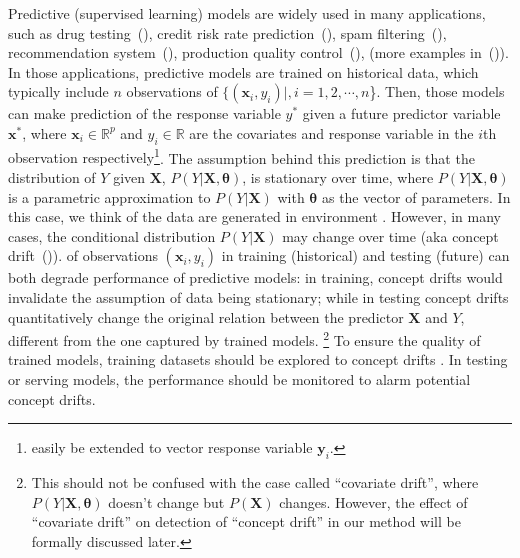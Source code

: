 \documentclass[twoside,11pt]{article}
\begin{document}
%
Predictive (supervised learning) models are widely used in many applications, {such as} drug testing~(\cite{fong2015change}), credit risk rate prediction~(\cite{im2012time}), spam filtering~(\cite{carmona2010gnusmail}), recommendation system~(\cite{koren2009collaborative}), production quality control~(\cite{bui2018monitoring}), {(more examples in~(\cite{vzliobaite2016overview}))}. In those applications, predictive models are trained on historical data, which typically include {$n$} observations of {$\{ (\bm {x}_i, y_i)|, i=1,2,\cdots,n$\}}. {Then, those models can make prediction of the response variable $y^*$ given a future predictor variable $\bm {x}^*$}, where {$\bm {x}_i \in \mathbb{R}^{p}$ and $y_i \in \mathbb{R}$ are the covariates and response variable in the $i$th observation respectively}\footnote{ easily be extended to vector response variable $\bm {y}_i$.}. The assumption behind this prediction is that the distribution of {$ {Y}$} given {$\bm {X}$}, {$P (Y| \bm {X}, \bm { \theta})$}, is stationary over time, {where $P (Y| \bm {X}, \bm { \theta})$ is a parametric approximation to $P (Y| \bm {X})$ with $\bm { \theta}$ as the vector of parameters}. In this case, we think of the data are generated in  environment . However, {in many cases, the} conditional distribution $P (Y| \bm {X})$ may change over time (aka concept drift~(\cite{moreno2012unifying})).  of observations $ (\bm {x}_i, y_i)$ in training (historical) and testing (future) can both degrade performance of predictive models: in training, concept drifts would invalidate the assumption of data being stationary; while in testing concept drifts quantitatively change the original relation between the predictor $\bm {X}$ and $Y$, different from the one captured by trained models. \footnote{This should not be confused with the case called ``covariate drift'', where {$P (Y| \bm {X}, \bm { \theta})$ doesn't change but $P (\bm {X})$ changes.} However, the effect of ``covariate drift'' on detection of ``concept drift'' in our method will be formally discussed later.}  To ensure the quality of trained models, training datasets should be explored to  concept drifts . In testing or serving models, the performance should be monitored to alarm  potential concept drifts. 
\end{document}
